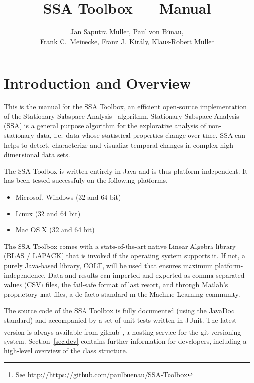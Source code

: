 \documentclass{article}
\newcommand{\1}{\ensuremath{\mathds{1}}}
\newcommand{\0}{\ensuremath{0}}
\begin{document}
\title{SSA Toolbox  --- Manual}
\author{Jan Saputra M\"uller, Paul von B\"unau, \\ Frank C.~Meinecke, Franz J.~Kir\'{a}ly, Klaus-Robert M\"uller}

\maketitle

\tableofcontents

\newpage

\section{Introduction and Overview}

This is the manual for the SSA Toolbox, an efficient open-source implementation of the 
Stationary Subspace Analysis~\cite{PRL:SSA:2009} algorithm. Stationary Subspace Analysis (SSA)
is a general purpose algorithm for the explorative analysis of non-stationary data, i.e.~data
whose statistical properties change over time. SSA can helps to detect, characterize and 
visualize temporal changes in complex high-dimensional data sets.

The SSA Toolbox is written entirely in Java and is thus platform-independent. It has been tested
successfuly on the following platforms.
\begin{itemize}
	\item Microsoft Windows (32 and 64 bit)
	\item Linux (32 and 64 bit)
	\item Mac OS X (32 and 64 bit)
\end{itemize}
The SSA Toolbox comes with a state-of-the-art native 
Linear Algebra library (BLAS / LAPACK) that is invoked if the operating system supports 
it. If not, a purely Java-based library, COLT, will be used that ensures maximum platform-independence. 
Data and results can imported and exported as comma-separated values (CSV) files, the fail-safe 
format of last resort, and through Matlab's proprietory mat files, a de-facto standard in the 
Machine Learning community.

The source code of the SSA Toolbox is fully documented (using the JavaDoc standard) and accompanied
by a set of unit tests written in JUnit. The latest version is always available from 
github\footnote{See \url{http://https://github.com/paulbuenau/SSA-Toolbox}}, a hosting service for
the git versioning system. Section~\ref{sec:dev} contains further information for developers, 
including a high-level overview of the class structure.
 
\end{document}

